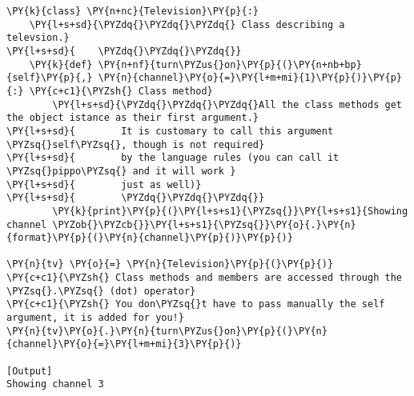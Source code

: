 \begin{Verbatim}[label=\makebox{\url{https://github.com/lucabaldini/cmepda/tree/master/slides/latex/snippets/class\_methods.py}},commandchars=\\\{\}]
\PY{k}{class} \PY{n+nc}{Television}\PY{p}{:}
    \PY{l+s+sd}{\PYZdq{}\PYZdq{}\PYZdq{} Class describing a televsion.}
\PY{l+s+sd}{    \PYZdq{}\PYZdq{}\PYZdq{}}
    \PY{k}{def} \PY{n+nf}{turn\PYZus{}on}\PY{p}{(}\PY{n+nb+bp}{self}\PY{p}{,} \PY{n}{channel}\PY{o}{=}\PY{l+m+mi}{1}\PY{p}{)}\PY{p}{:} \PY{c+c1}{\PYZsh{} Class method}
        \PY{l+s+sd}{\PYZdq{}\PYZdq{}\PYZdq{}All the class methods get the object istance as their first argument.}
\PY{l+s+sd}{        It is customary to call this argument \PYZsq{}self\PYZsq{}, though is not required}
\PY{l+s+sd}{        by the language rules (you can call it \PYZsq{}pippo\PYZsq{} and it will work }
\PY{l+s+sd}{        just as well)}
\PY{l+s+sd}{        \PYZdq{}\PYZdq{}\PYZdq{}}
        \PY{k}{print}\PY{p}{(}\PY{l+s+s1}{\PYZsq{}}\PY{l+s+s1}{Showing channel \PYZob{}\PYZcb{}}\PY{l+s+s1}{\PYZsq{}}\PY{o}{.}\PY{n}{format}\PY{p}{(}\PY{n}{channel}\PY{p}{)}\PY{p}{)}

\PY{n}{tv} \PY{o}{=} \PY{n}{Television}\PY{p}{(}\PY{p}{)}
\PY{c+c1}{\PYZsh{} Class methods and members are accessed through the \PYZsq{}.\PYZsq{} (dot) operator}
\PY{c+c1}{\PYZsh{} You don\PYZsq{}t have to pass manually the self argument, it is added for you!}
\PY{n}{tv}\PY{o}{.}\PY{n}{turn\PYZus{}on}\PY{p}{(}\PY{n}{channel}\PY{o}{=}\PY{l+m+mi}{3}\PY{p}{)}

[Output]
Showing channel 3
\end{Verbatim}